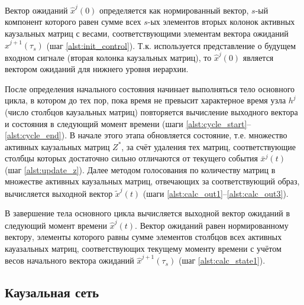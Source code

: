 \documentclass[12pt]{scrartcl}
\newcommand{\linesprval}{1}
\begin{document}
	Вектор ожиданий $\hat x^j(0)$ определяется как нормированный вектор, $s$-ый компонент которого равен сумме всех $s$-ых элементов вторых колонок активных каузальных матриц с весами, соответствующими элементам вектора ожиданий $\hat x^{j+1}(\tau_s)$ (шаг \ref{alst:init_control}). Т.к. используется представление о будущем входном сигнале (вторая колонка каузальных матриц), то $\hat x^j(0)$ является вектором ожиданий для нижнего уровня иерархии.

	\linespread{1}
	\begin{algorithm}[H]
		\begin{algorithmic}[1]
			
		\end{algorithmic}
	\end{algorithm}
	\linespread{\linesprval}
		
	После определения начального состояния начинает выполняться тело основного цикла, в котором до тех пор, пока время не превысит характерное время узла $h^j$ (число столбцов каузальных матриц) повторяется вычисление выходного вектора и состояния в следующий момент времени (шаги \ref{alst:cycle_start}--\ref{alst:cycle_end}). В начале этого этапа обновляется состояние, т.е. множество активных каузальных матриц $Z^*$, за счёт удаления тех матриц, соответствующие столбцы которых достаточно сильно отличаются от текущего события $\bar x^j(t)$ (шаг \ref{alst:update_z}). Далее методом голосования по количеству матриц в множестве активных каузальных матриц, отвечающих за соответствующий образ, вычисляется выходной вектор $\tilde x^j(t)$ (шаги \ref{alst:calc_out1}--\ref{alst:calc_out3}).

	В завершение тела основного цикла вычисляется выходной вектор ожиданий в следующий момент времени $\hat x^j(t)$. Вектор ожиданий равен нормированному вектору, элементы которого равны сумме элементов столбцов всех активных кауазальных матриц, соответствующих текущему моменту времени с учётом весов начального вектора ожиданий $\hat x^{j+1}(\tau_s)$ (шаг \ref{alst:calc_state1}).

	\subsection{Каузальная сеть}
	
\end{document}
